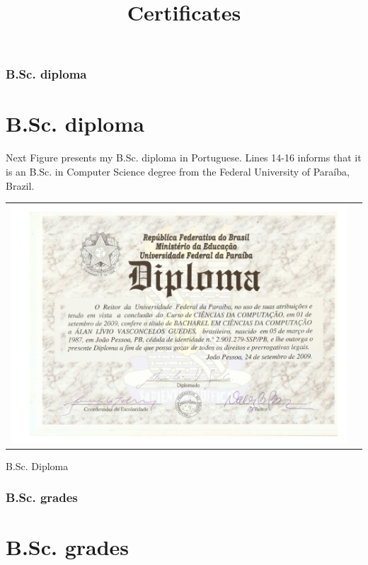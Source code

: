 \documentclass[10pt,a4paper,sans,colorlinks]{moderncv}
\title{Certificates}
\begin{document}
\hfHyperrefSetupBlueLinks
\makecvtitle
\tableofcontents

\newpage
\section{B.Sc. diploma}\part{B.Sc. diploma}
Next Figure presents my B.Sc. diploma in Portuguese.
Lines 14-16 informs that it is an B.Sc. in Computer Science degree from the Federal University of Paraíba, Brazil.

\begin{Figure}
  \begin{tabularx}{\textwidth}{X p{1cm}}
    \includegraphics[align=t,width=\textwidth, keepaspectratio]{certificates/bsc-diploma.pdf}
  \end{tabularx}
  \caption{B.Sc. Diploma}
\end{Figure}

\newpage
\section{B.Sc. grades}\part{B.Sc. grades}
\end{document}
